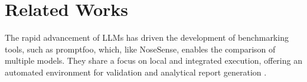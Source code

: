 \documentclass[sigconf]{acmart}
\begin{document}

\section{Related Works}

The rapid advancement of LLMs has driven the development of benchmarking tools, such as promptfoo, which, like NoseSense, enables the comparison of multiple models. They share a focus on local and integrated execution, offering an automated environment for validation and analytical report generation \cite{webster2023promptfoo,shankar2024validates,10.1145/3772318.3790897}.

\end{document}
